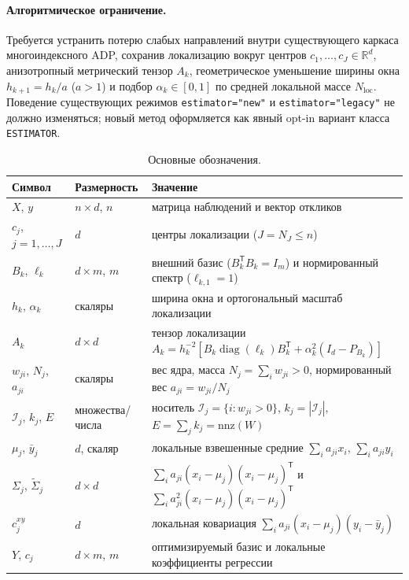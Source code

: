 \documentclass[11pt,a4paper]{article}
\numberwithin{equation}{section}
\theoremstyle{definition}
\theoremstyle{remark}
\newcommand{\R}{\mathbb{R}}
\newcommand{\diag}{\operatorname{diag}}
\newcommand{\T}{^{\mathsf T}}
\newcommand{\code}[1]{\nolinkurl{#1}}
\begin{document}
\paragraph{Алгоритмическое ограничение.}
Требуется устранить потерю слабых направлений внутри существующего каркаса
многоиндексного ADP, сохранив локализацию вокруг центров $c_1, \dots, c_J \in \R^d$,
анизотропный метрический тензор $A_k$, геометрическое уменьшение ширины окна
$h_{k+1} = h_k / a$ ($a > 1$) и подбор $\alpha_k \in [0,1]$ по средней локальной массе $N_{\mathrm{loc}}$.
Поведение существующих режимов \code{estimator="new"} и \code{estimator="legacy"}
не должно изменяться; новый метод оформляется как явный opt-in вариант класса
\texttt{ESTIMATOR}.

\begin{table}[htbp]
\centering
\caption{Основные обозначения.}
\label{tab:notation}
\small
\begin{tabularx}{\textwidth}{@{}llY@{}}
\toprule
Символ & Размерность & Значение \\
\midrule
$X$, $y$ & $n \times d$, $n$ & матрица наблюдений и вектор откликов \\
$c_j$, $j=1,\dots,J$ & $d$ & центры локализации ($J = N_J \le n$) \\
$B_k$, $\ell_k$ & $d \times m$, $m$ & внешний базис ($B_k\T B_k = I_m$) и нормированный спектр ($\ell_{k,1}=1$) \\
$h_k$, $\alpha_k$ & скаляры & ширина окна и ортогональный масштаб локализации \\
$A_k$ & $d \times d$ & тензор локализации $A_k = h_k^{-2}[B_k\diag(\ell_k)B_k\T + \alpha_k^2(I_d - P_{B_k})]$ \\
$w_{ji}$, $N_j$, $a_{ji}$ & скаляры & вес ядра, масса $N_j = \sum_i w_{ji} > 0$, нормированный вес $a_{ji} = w_{ji}/N_j$ \\
$\mathcal{I}_j$, $k_j$, $E$ & множества/числа & носитель $\mathcal{I}_j = \{i : w_{ji} > 0\}$, $k_j = |\mathcal{I}_j|$, $E = \sum_j k_j = \mathrm{nnz}(W)$ \\
$\mu_j$, $\bar{y}_j$ & $d$, скаляр & локальные взвешенные средние $\sum_i a_{ji} x_i$, $\sum_i a_{ji} y_i$ \\
$\Sigma_j$, $\widetilde{\Sigma}_j$ & $d \times d$ & $\sum_i a_{ji}(x_i-\mu_j)(x_i-\mu_j)\T$ и $\sum_i a_{ji}^2(x_i-\mu_j)(x_i-\mu_j)\T$ \\
$c_j^{xy}$ & $d$ & локальная ковариация $\sum_i a_{ji}(x_i-\mu_j)(y_i-\bar{y}_j)$ \\
$Y$, $c_j$ & $d \times m$, $m$ & оптимизируемый базис и локальные коэффициенты регрессии \\
\bottomrule
\end{tabularx}
\end{table}
\end{document}
